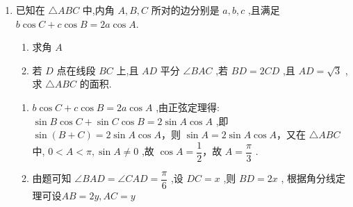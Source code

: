 \begin{enumerate}
\begin{enumerate}
\begin{jieda}
\begin{dingautolist}{172}
                大三角形面积等于两个小三角形面积，$\dfrac{1}{2} \times \dfrac{4\sqrt{6}}{5} \times 2 \times sin\left(\dfrac{C}{2}\right) + \dfrac{1}{2} \times \dfrac{4\sqrt{6}}{5} \times 3 \times sin\left(\dfrac{C}{2}\right) = \dfrac{1}{2} \times 3 \times 2 \times sinC$，整理得$2sin\dfrac{C}{2}(3cos\dfrac{C}{2}-\sqrt{6}) = 0$，因为$sin\dfrac{C}{2} > 0$，所以$cos\dfrac{C}{2} = \dfrac{\sqrt{6}}{3}$，故$cosC = \dfrac{1}{3}$
            \end{dingautolist}
            故$AB = 3$，$AE = BE = \dfrac{3}{2}$

            设$CE = y$，根据余弦定理有$\left\{\begin{array}{l}
                 4 = \dfrac{9}{4} + y^2 - 3ycos\theta  \\
                 9 = \dfrac{9}{4} + y^2 + 3ycos\theta
            \end{array}\right.$，两式相加的可得$x = \dfrac{\sqrt{17}}{2}$
        \end{jieda}
        \item 已知在 $\bigtriangleup  {ABC}$ 中,内角 $A,B,C$ 所对的边分别是 $a,b,c$ ,且满足$b\cos C + c\cos B = {2a}\cos A.$
        \begin{enumerate}
            \item 求角 $A$
            \item 若 $D$ 点在线段 ${BC}$ 上,且 ${AD}$ 平分 $\angle {BAC}$ ,若 ${BD} = {2CD}$ ,且 ${AD} = \sqrt{3}$ ,求 $\bigtriangleup  {ABC}$ 的面积.
        \end{enumerate}
        \begin{jieda}
            \begin{enumerate}
                \item $b\cos C + c\cos B = {2a}\cos A$ ,由正弦定理得:$\sin B\cos C + \sin C\cos B = 2\sin A\cos A$ ,即 $\sin \left( {B + C}\right)  = 2\sin A\cos A$，则 $\sin A = 2\sin A\cos A$，又在 $\bigtriangleup  {ABC}$ 中, $0 < A < \pi ,\sin A \neq  0$ ,故 $\cos A = \dfrac{1}{2}$，故 $A = \dfrac{\pi }{3}$ .
                \item 由题可知 $\angle {BAD} = \angle {CAD} = \dfrac{\pi }{6}$ ,设 ${DC} = x$ ,则 ${BD} = {2x}$ , 根据角分线定理可设${AB} = 2y,{AC} = y$
\end{enumerate}
\end{jieda}
\end{enumerate}
\end{enumerate}
